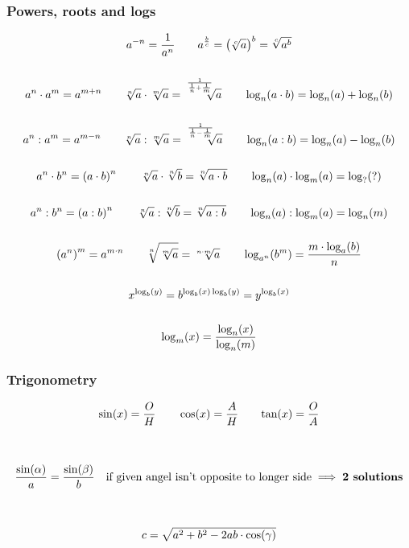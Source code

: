 \subsubsection{Powers, roots and logs}

\begin{gather*}
    a^{-n} = \dfrac{1}{a^n} \qquad
    a^{\frac{ b}{ c}} = \left( \sqrt[ c]{a} \space\right)^b =  \sqrt[ c]{a^b}
    \\\\
    a^n \cdot a^m = a^{m+n} \qquad
    \sqrt[n]{a}\cdot\sqrt[m]{a} = \sqrt[\uproot{15}\frac{1}{\frac{1}{n}+\frac{1}{m}}]{a} \qquad
    \log_n(a\cdot b)=\log_n(a) + \log_n(b)
    \\\\
    a^n : a^m = a^{m-n} \qquad
    \sqrt[n]{a}:\sqrt[m]{a} = \sqrt[\uproot{15}\frac{1}{\frac{1}{n}-\frac{1}{m}}]{a} \qquad    
    \log_n(a : b)=\log_n(a) - \log_n(b) 
    \\\\
    a^n \cdot b^n = \left( a \cdot b\right)^n \qquad
    \sqrt[n]{a} \cdot \sqrt[n]{b} = \sqrt[n]{a \cdot b} \qquad
    \log_n(a)\cdot\log_m(a) = \log_?(?)
    \\\\
    a^n : b^n = \left(a : b\right)^n \qquad
    \sqrt[n]{a} : \sqrt[n]{b} = \sqrt[n]{a : b} \qquad
    \log_n(a):\log_m(a) = \log_n(m)
    \\\\ 
    \left( a^n \right) ^ m = a^{m\space\cdot\space n}\qquad
    \sqrt[n]{\sqrt[m]{a}} = \sqrt[n \cdot m]{a}  \qquad
    \log_{a^n}(b^m) = \frac{m\cdot\log_a(b)}{n}
    \\\\
    x^{\log_b(y)}=b^{\log_b(x)\log_b(y)}=y^{\log_b(x)}
    \\\\
    \log_m(x) = \dfrac{\log_n(x)}{\log_n(m)}
\end{gather*}


\subsubsection{Trigonometry}

\begin{gather*}
    \sin(x) = \dfrac{O}{H} \qquad \cos(x) = \dfrac{A}{H} \qquad \text{tan}(x) = \dfrac{O}{A} \\ \space \\
    \\
    \dfrac{\text{sin}(\alpha)}{a} = \dfrac{\text{sin}(\beta)}{b}\kern 1em \text{if given angel isn't opposite to longer side} \implies \textbf{2 solutions} \\ \space \\
    \\
    c = \sqrt{a^2+b^2-2ab\cdot\text{cos}(\gamma)}
\end{gather*}

